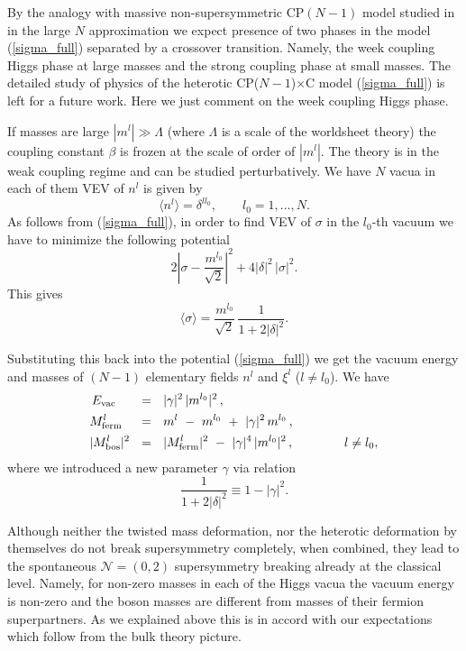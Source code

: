 \documentclass[12pt]{article}
\def\beq{\begin{equation}}
\def\eeq{\end{equation}}
\newcommand{\ntwoo}{${\mathcal N}= \left(0,2\right) $ }
\newcommand{\CPC}{CP($N-1$)$\times$C }
\begin{document}
By the analogy with massive non-supersymmetric CP$(N-1)$ model
studied in \cite{GSYphtr} in the large $N$ approximation we expect
presence of two phases in the model (\ref{sigma_full})
separated by a crossover transition.
Namely, the week coupling Higgs phase at large masses and 
the strong
coupling phase at small masses. The detailed study of physics
of the heterotic \CPC model (\ref{sigma_full}) is left for a future work. Here we just comment on the week coupling Higgs phase.

If masses are large $|m^l|\gg \Lambda$ (where $\Lambda$ is
a scale of the worldsheet theory) the coupling constant
$\beta$ is frozen at the scale of order of $|m^l|$.
The theory is in the weak coupling regime and can be studied
perturbatively. We have $N$ vacua in each of them VEV of
$n^l$ is given by
\beq
\langle n^l \rangle =\delta^{ll_0}, \qquad l_0=1,...,N.
\label{higgsn}
\eeq
As follows from (\ref{sigma_full}), in order to find VEV of $\sigma$ in the $l_0$-th vacuum we have to minimize the following potential
\beq
2\left|\sigma -\frac{m^{l_0}}{\sqrt{2}}\right|^2 
+4|\delta|^2\,|\sigma|^2.
\label{sigmapot}
\eeq
This gives
\beq
\langle \sigma \rangle = \frac{m^{l_0}}{\sqrt{2}}\,
\frac{1}{1+2|\delta|^2}.
\label{higgssigma}
\eeq

Substituting this back into the potential (\ref{sigma_full})
we get the vacuum energy and masses of $(N-1)$
elementary fields $n^l$ and $\xi^l$ ($l\neq l_0$). We have
\begin{align}
%
\notag
	E_\text{vac}~~\;\, & ~~=~~ |\gamma|^2\, |m^{l_0}|^2 \,,
	\\
%
\label{hetmass}
	M_\text{ferm}^l\;\,\, & ~~=~~ m^l ~-~ m^{l_0} ~+~ |\gamma|^2\,m^{l_0} \,,
	\\
%
\notag
	| M_\text{bos}^l |^2 & ~~=~~ | M_\text{ferm}^l |^2 ~-~ |\gamma|^4\, |m^{l_0}|^2\,,
	\qquad\qquad
	l\neq l_0,
\end{align}
where we introduced a new parameter $\gamma$ via relation
\beq
\frac{1}{1+2|\delta|^2}\equiv 1-|\gamma|^2.
\label{gammadelta}
\eeq

	Although neither the twisted mass deformation, nor the heterotic deformation by themselves
	do not break supersymmetry completely, when combined, they lead to the spontaneous \ntwoo supersymmetry breaking
	already at the classical level.
 Namely, for non-zero masses 
in each of the Higgs vacua
the vacuum energy is non-zero and the boson masses are different from masses of their fermion superpartners. As we explained
above this is in accord with our expectations which follow
from the bulk theory picture.
\end{document}
